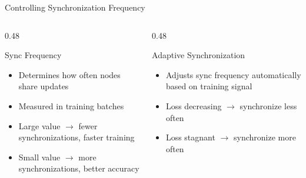 \documentclass[aspectratio=169]{beamer}
\begin{document}
\begin{frame}{Controlling Synchronization Frequency}
    \begin{columns}[T]
        \begin{column}{0.48\textwidth}
            \begin{block}{Sync Frequency}
                \begin{itemize}
                    \item Determines how often nodes share updates
                    \item Measured in training batches
                    \item Large value $\rightarrow$ fewer synchronizations, faster training
                    \item Small value $\rightarrow$ more synchronizations, better accuracy
                \end{itemize}
            \end{block}
        \end{column}
        \begin{column}{0.48\textwidth}
            \begin{block}{Adaptive Synchronization}
                \begin{itemize}
                    \item Adjusts sync frequency automatically based on training signal
                    \item Loss decreasing $\rightarrow$ synchronize less often
                    \item Loss stagnant $\rightarrow$ synchronize more often
                \end{itemize}
            \end{block}
        \end{column}
    \end{columns}
\end{frame}
\end{document}
